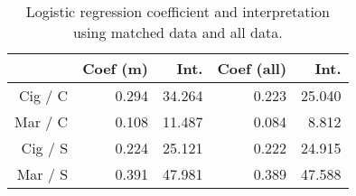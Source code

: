 \begin{table}[ht]
\centering
\begin{tabular}{rrrrr}
  \hline
 & Coef (m) & Int. & Coef (all) & Int. \\ 
  \hline
Cig / C & 0.294 & 34.264 & 0.223 & 25.040 \\ 
 Mar / C & 0.108 & 11.487 & 0.084 & 8.812 \\ 
 Cig / S & 0.224 & 25.121 & 0.222 & 24.915 \\ 
 Mar / S & 0.391 & 47.981 & 0.389 & 47.588 \\ 
   \hline
\end{tabular}
\caption{Logistic regression coefficient and interpretation using matched data and all data.}
\end{table}
